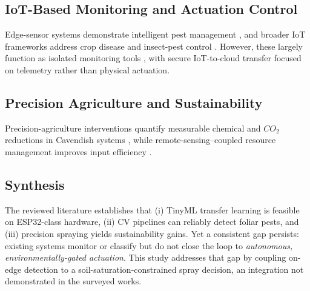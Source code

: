 \documentclass[conference]{IEEEtran}
\begin{document}
\subsection{IoT-Based Monitoring and Actuation Control}
Edge-sensor systems demonstrate intelligent pest management \cite{ahmed2024}, and broader IoT frameworks address crop disease and insect-pest control \cite{wang2024}. However, these largely function as isolated monitoring tools \cite{sneineh2023}, with secure IoT-to-cloud transfer \cite{deoliveira2025} focused on telemetry rather than physical actuation.

\subsection{Precision Agriculture and Sustainability}
Precision-agriculture interventions quantify measurable chemical and $CO_2$ reductions in Cavendish systems \cite{demandar2026}, while remote-sensing–coupled resource management improves input efficiency \cite{zeyliger2023}.

\subsection{Synthesis}
The reviewed literature establishes that (i) TinyML transfer learning is feasible on ESP32-class hardware, (ii) CV pipelines can reliably detect foliar pests, and (iii) precision spraying yields sustainability gains. Yet a consistent gap persists: existing systems monitor or classify but do not close the loop to \emph{autonomous, environmentally-gated actuation}. This study addresses that gap by coupling on-edge detection to a soil-saturation-constrained spray decision, an integration not demonstrated in the surveyed works.

\begin{table}[htbp]
\caption{Summary of Core Comparative Literature}
\label{tab:rrl}
\centering
{}
\end{table}
\end{document}
